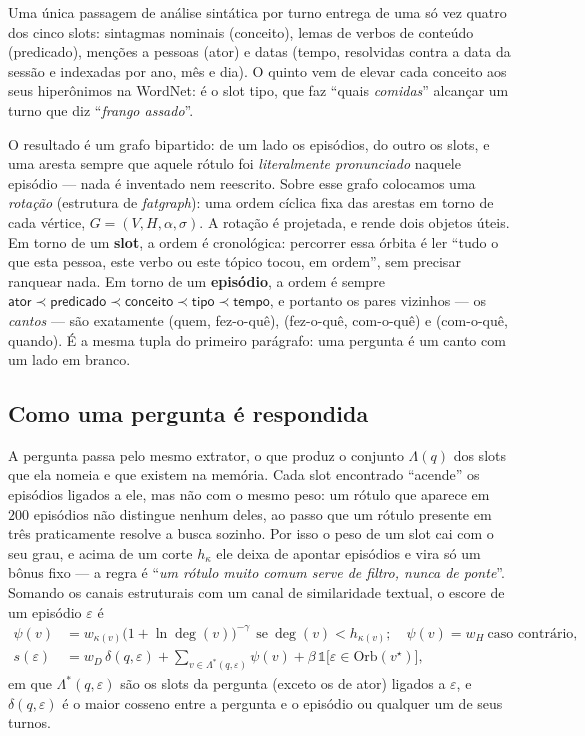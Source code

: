 Uma única passagem de análise sintática por turno entrega de uma só vez quatro dos
cinco slots: sintagmas nominais (\textsf{conceito}), lemas de verbos de conteúdo
(\textsf{predicado}), menções a pessoas (\textsf{ator}) e datas (\textsf{tempo},
resolvidas contra a data da sessão e indexadas por ano, mês e dia). O quinto vem de elevar cada conceito aos seus hiperônimos na WordNet: é o
slot \textsf{tipo}, que faz ``quais \emph{comidas}'' alcançar um turno que diz
``\emph{frango assado}''.

O resultado é um grafo bipartido: de um lado os episódios, do outro os slots, e uma
aresta sempre que aquele rótulo foi \emph{literalmente pronunciado} naquele
episódio --- nada é inventado nem reescrito. Sobre esse grafo colocamos uma \emph{rotação}
(estrutura de \emph{fatgraph}): uma ordem cíclica fixa das arestas em torno de cada
vértice, $G=(V,H,\alpha,\sigma)$. A rotação é projetada, e rende dois objetos úteis. Em torno de um \textbf{slot}, a ordem é cronológica: percorrer
essa órbita é ler ``tudo o que esta pessoa, este verbo ou este tópico tocou, em
ordem'', sem precisar ranquear nada. Em torno de um \textbf{episódio}, a ordem é
sempre $\textsf{ator}\prec\textsf{predicado}\prec\textsf{conceito}\prec
\textsf{tipo}\prec\textsf{tempo}$, e portanto os pares vizinhos --- os
\emph{cantos} --- são exatamente (quem, fez-o-quê), (fez-o-quê, com-o-quê) e
(com-o-quê, quando). É a mesma tupla do primeiro parágrafo: uma pergunta é um canto
com um lado em branco.

\subsection{Como uma pergunta é respondida}
\label{sec:metodo:consulta}

A pergunta passa pelo mesmo extrator, o que produz o conjunto $\Lambda(q)$ dos
slots que ela nomeia e que existem na memória. Cada slot encontrado ``acende'' os
episódios ligados a ele, mas não com o mesmo peso: um rótulo que aparece em $200$
episódios não distingue nenhum deles, ao passo que um rótulo presente em três
praticamente resolve a busca sozinho. Por isso o peso de um slot cai com o seu
grau, e acima de um corte $h_\kappa$ ele deixa de apontar episódios e vira só um
bônus fixo --- a regra é ``\emph{um rótulo muito comum serve de filtro, nunca de
ponte}''. Somando os canais estruturais com um canal de similaridade textual, o
escore de um episódio $\varepsilon$ é
\begin{equation}
\begin{aligned}
\psi(v)&=w_{\kappa(v)}\bigl(1+\ln \deg(v)\bigr)^{-\gamma}\ \ \text{se}\ \deg(v)<h_{\kappa(v)};\quad
\psi(v)=w_{H}\ \text{caso contrário},\\
s(\varepsilon)&=w_{D}\,\delta(q,\varepsilon)+\sum_{v\in\Lambda^{*}(q,\varepsilon)}\psi(v)
+\beta\,\mathbb{1}\bigl[\varepsilon\in\mathrm{Orb}(v^{\star})\bigr],
\end{aligned}
\label{eq:psi}
\end{equation}
em que $\Lambda^{*}(q,\varepsilon)$ são os slots da pergunta (exceto os de ator)
ligados a $\varepsilon$, e $\delta(q,\varepsilon)$ é o maior cosseno entre a
pergunta e o episódio ou qualquer um de seus turnos.

